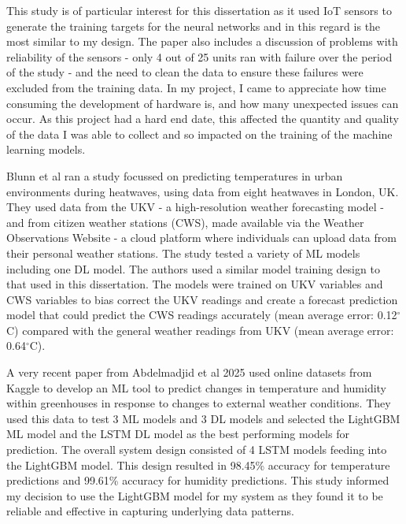 This study is of particular interest for this dissertation as it used IoT
sensors to generate the training targets for the neural networks and in this
regard is the most similar to my design. The paper also includes a discussion of
problems with reliability of the sensors - only 4 out of 25 units ran with
failure over the period of the study - and the need to clean the data to ensure
these failures were excluded from the training data. In my project, I came to
appreciate how time consuming the development of hardware is, and how many
unexpected issues can occur. As this project had a hard end date, this affected
the quantity and quality of the data I was able to collect and so impacted on
the training of the machine learning models.

Blunn et al \cite{blunn2024machine} ran a study focussed on predicting
temperatures in urban environments during heatwaves, using data from eight
heatwaves in London, UK. They used data from the UKV - a high-resolution weather
forecasting model - and from citizen weather stations (CWS), made available via
the Weather Observations Website - a cloud platform where individuals can upload
data from their personal weather stations. The study tested a variety of ML
models including one DL model. The authors used a similar model training design
to that used in this dissertation. The models were trained on UKV variables and
CWS variables to bias correct the UKV readings and create a forecast prediction
model that could predict the CWS readings accurately (mean average error:
0.12\(^\circ\)C) compared with the general weather readings from UKV (mean
average error: 0.64\(^\circ\)C).

A very recent paper from Abdelmadjid et al 2025 \cite{abdelmadjid2025enhancing}
used online datasets from Kaggle
to develop an ML tool to predict changes in temperature and humidity within
greenhouses in response to changes to external weather conditions.  They used
this data to test 3 ML models and 3 DL models and selected the LightGBM ML model
and the LSTM DL model as the best performing models for prediction. The overall
system design consisted of 4 LSTM models feeding into the LightGBM model. This
design resulted in 98.45\% accuracy for temperature predictions and 99.61\%
accuracy for humidity predictions. This study informed my decision to use the
LightGBM model for my system as they found it  to be reliable and effective in
capturing underlying data patterns.
